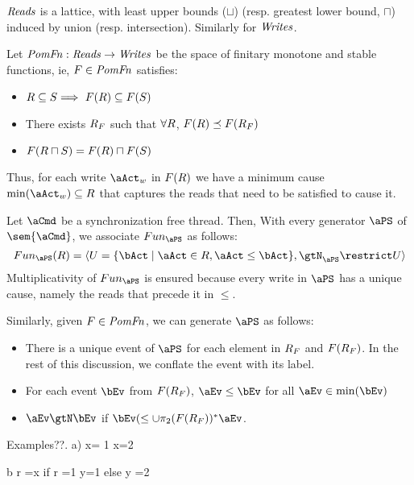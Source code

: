 $\mathit{Reads}$ is a lattice, with least upper bounds ($\sqcup$) (resp. greatest lower bound, $\sqcap$)  induced by union (resp. intersection).  Similarly for $\mathit{Writes}$. 

\begin{definition}
Let $\mathit{PomFn}: \mathit{Reads} \rightarrow \mathit{Writes}$ be the space of finitary monotone and stable functions, ie, $F \in \mathit{PomFn}$ satisfies:
\begin{itemize}
\item $R \subseteq S \Longrightarrow\ F(R) \subseteq F(S)$
\item There exists $R_{F}$ such that $\forall R$, $F(R) \preceq F(R_{F})$
\item $F(R \sqcap S) =  F(R) \sqcap F(S)$
\end{itemize}
\end{definition}
Thus, for each write  $\aWrite$ in $F(R)$ we have a minimum cause $\min(\aWrite) \subseteq \aRSet$ that captures the reads that need to be satisfied to cause it.   

Let $\aCmd$ be a synchronization free thread.  Then, 
With every generator $\aPS$ of  $\sem{\aCmd}$, we associate $\pomf{\aPS}$ as follows:
\[ \pomf{\aPS}(\aRSet) = \langle \aWSet = \{ \bAct \mid \aAct \in \aRSet, \aAct \le \bAct \}, \gtN_{\aPS} \restrict \aWSet \rangle \]
Multiplicativity  of $\pomf{\aPS}$ is ensured because every write in $\aPS$ has a unique cause, namely the reads that precede it in $\le$.

Similarly, given $F \in \mathit{PomFn}$, we can generate $\aPS$ as follows:
\begin{itemize}
\item There is a unique event of $\aPS$ for each element in $R_{F}$ and $F(R_{F})$.  In the rest of this discussion, we conflate the event with its label.
\item For each event $\bEv$ from $F(R_{F})$, $\aEv \le \bEv$ for all $\aEv \in \min(\bEv)$
\item $\aEv \gtN \bEv$ if $ \bEv (\le \cup \pi_2(\aFn(\aRSet_{\aFn}))^* \aEv$.
\end{itemize}

Examples??.  
a) x= 1
x=2

b  r =x
   if r =1  {y=1}
   else      {y =2}

